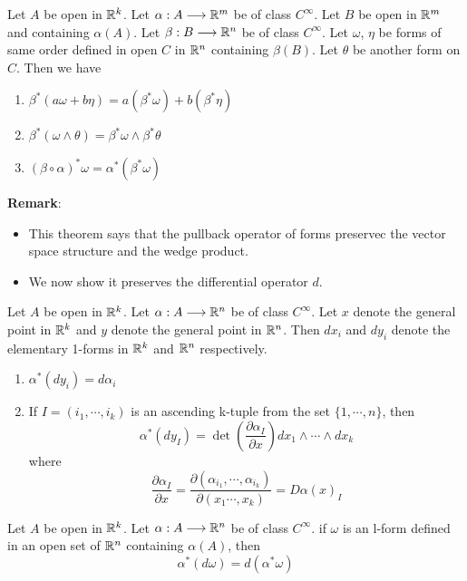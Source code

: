 \begin{theorem}
    Let $A$ be open in $\mathbb{R}^k$. Let $\alpha:A\longrightarrow\mathbb{R}^m$ be of class $C^{\infty}$. Let $B$ be open in $\mathbb{R}^m$ and containing $\alpha(A)$. 
    Let $\beta:B\longrightarrow\mathbb{R}^n$ be of class $C^{\infty}$. 
    Let $\omega$, $\eta$ be forms of same order defined in open $C$ in $\mathbb{R}^n$ containing $\beta(B)$. Let $\theta$ be another form on $C$. Then we have
    \begin{enumerate}
        \item $\beta^*(a\omega+b\eta)=a(\beta^*\omega)+b(\beta^*\eta)$
        \item $\beta^*(\omega\wedge\theta)=\beta^*\omega\wedge\beta^*\theta$
        \item $(\beta\circ\alpha)^*\omega=\alpha^*(\beta^*\omega)$
    \end{enumerate}
\end{theorem}
\noindent\textbf{Remark}:
\begin{itemize}
    \item This theorem says that the pullback operator of forms preservec the vector space structure and the wedge product.
    \item We now show it preserves the differential operator $d$.
\end{itemize}

\begin{theorem}
    Let $A$ be open in $\mathbb{R}^k$. Let $\alpha:A\longrightarrow\mathbb{R}^n$ be of class $C^{\infty}$. 
    Let $x$ denote the general point in $\mathbb{R}^k$ and $y$ denote the general point in $\mathbb{R}^n$. 
    Then $dx_i$ and $dy_i$ denote the elementary 1-forms in $\mathbb{R}^k$ and $\mathbb{R}^n$ respectively.
    \begin{enumerate}
        \item $\alpha^*(dy_i)=d\alpha_i$
        \item If $I=(i_1,\cdots,i_k)$ is an ascending k-tuple from the set $\{1,\cdots,n\}$, then $$\alpha^*(dy_I)=\det(\frac{\partial \alpha_I}{\partial x})dx_1\wedge \cdots \wedge dx_k$$
        where $$\frac{\partial \alpha_I}{\partial x}=\frac{\partial (\alpha_{i_1},\cdots,\alpha_{i_k})}{\partial (x_1\cdots,x_k)}=D\alpha(x)_I$$
    \end{enumerate}
\end{theorem}

\begin{theorem}
    Let $A$ be open in $\mathbb{R}^k$. Let $\alpha:A\longrightarrow\mathbb{R}^n$ be of class $C^{\infty}$. 
    if $\omega$ is an l-form defined in an open set of $\mathbb{R}^n$ containing $\alpha(A)$, then $$\alpha^*(d\omega)=d(\alpha^*\omega)$$
\end{theorem}

